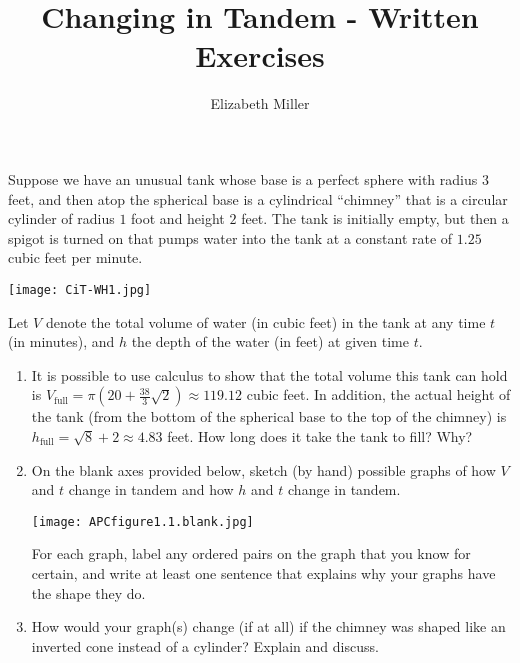 \documentclass[handout]{ximera}
\author{Elizabeth Miller}
\title{Changing in Tandem - Written Exercises}
\begin{document}
\begin{abstract}
\end{abstract}
\maketitle




\begin{problem}
Suppose we have an unusual tank whose base is a perfect sphere with radius $3$ feet, and then atop the spherical base is a cylindrical ``chimney'' that is a circular cylinder of radius $1$ foot and height $2$ feet.  The tank is initially empty, but then a spigot is turned on that pumps water into the tank at a constant rate of $1.25$ cubic feet per minute.%

\texttt{[image: CiT-WH1.jpg]}

Let $V$ denote the total volume of water (in cubic feet) in the tank at any time $t$ (in minutes), and $h$ the depth of the water (in feet) at given time $t$.%

\begin{enumerate}[label=\alph*.]
\item It is possible to use calculus to show that the total volume this tank can hold is $V_{\text{full}} = \pi(20 + \frac{38}{3}\sqrt{2}) \approx 119.12$ cubic feet.  In addition, the actual height of the tank (from the bottom of the spherical base to the top of the chimney) is $h_{\text{full}} = \sqrt{8} + 2 \approx 4.83$ feet.  How long does it take the tank to fill?   Why?%
\item On the blank axes provided below, sketch (by hand) possible graphs of how $V$ and $t$ change in tandem and how $h$ and $t$ change in tandem.%

\texttt{[image: APCfigure1.1.blank.jpg]}

For each graph, label any ordered pairs on the graph that you know for certain, and write at least one sentence that explains why your graphs have the shape they do.%
\item How would your graph(s) change (if at all) if the chimney was shaped like an inverted cone instead of a cylinder?  Explain and discuss.%
\end{enumerate}

\end{problem}
\end{document}
